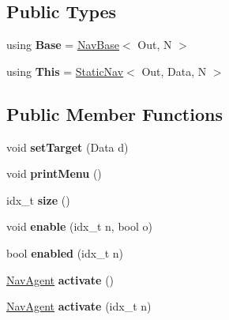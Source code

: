 \subsection*{Public Types}
\begin{DoxyCompactItemize}
\item 
\mbox{\label{classStaticNav_ab2ae6346fddbb5950059933ef9012b01}} 
using {\bfseries Base} = \hyperlink{classNavBase}{Nav\+Base}$<$ Out, N $>$
\item 
\mbox{\label{classStaticNav_a0d189566b3180f3813f10b1a002e21a3}} 
using {\bfseries This} = \hyperlink{classStaticNav}{Static\+Nav}$<$ Out, Data, N $>$
\end{DoxyCompactItemize}
\subsection*{Public Member Functions}
\begin{DoxyCompactItemize}
\item 
\mbox{\label{classStaticNav_aa8cff1184d567261a965fd156ffdea0f}} 
void {\bfseries set\+Target} (Data d)
\item 
\mbox{\label{classStaticNav_a91d58be31f193e1597297e3c0ad21075}} 
void {\bfseries print\+Menu} ()
\item 
\mbox{\label{classStaticNav_acb2ba41d545d2a85e85a99eee29fc997}} 
idx\+\_\+t {\bfseries size} ()
\item 
\mbox{\label{classStaticNav_a5351ff6e5c461ba17d58e61f50afdc7e}} 
void {\bfseries enable} (idx\+\_\+t n, bool o)
\item 
\mbox{\label{classStaticNav_a91d588d2e25e30cdcfe67d4f1193f728}} 
bool {\bfseries enabled} (idx\+\_\+t n)
\item 
\mbox{\label{classStaticNav_a7f60ebff6754ffdc19b41efdb653e82f}} 
\hyperlink{structNavAgent}{Nav\+Agent} {\bfseries activate} ()
\item 
\mbox{\label{classStaticNav_a398534802c57a6161a7a350db96473ee}} 
\hyperlink{structNavAgent}{Nav\+Agent} {\bfseries activate} (idx\+\_\+t n)
\end{DoxyCompactItemize}
